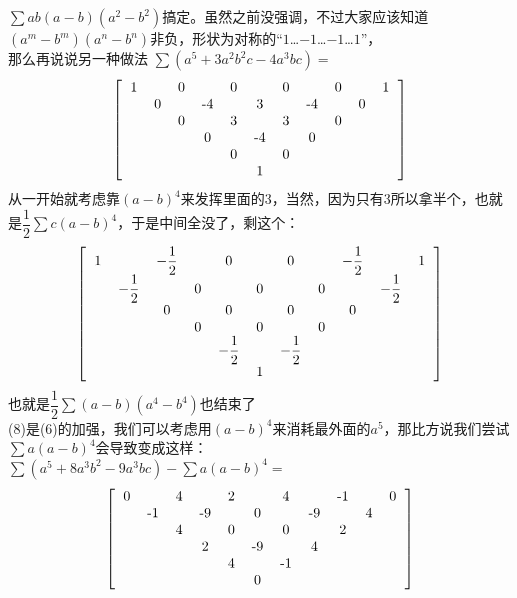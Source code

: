 \documentclass[UTF8]{ctexart}
\begin{document}
$ \displaystyle \sum ab(a-b)(a^{2}-b^{2}) $搞定。虽然之前没强调，不过大家应该知道$ (a^{m}-b^{m})(a^{n}-b^{n}) $非负，形状为对称的“$ 1 $…$ -1 $…$ -1 $…$ 1 $”，\\
那么再说说另一种做法
$ \displaystyle \sum (a^{5}+3a^{2}b^{2}c-4a^{3}bc)= $
  \renewcommand*{\arraystretch}{1.732}\[\left[\begin{matrix}
  	\begin{tabular}{ccccccccccccc}
  		1& &0& &0& &0& &0& &1\\
  		&0& &-4& &3& &-4& &0&\\
  		& &0& &3& &3& &0& &\\
  		& & &0& &-4& &0& & &\\
  		& & & &0& &0& & & &\\
  		& & & & &1& & & & &\\
  	\end{tabular}
  \end{matrix}\right]\]
从一开始就考虑靠$ (a-b)^{4} $来发挥里面的3，当然，因为只有3所以拿半个，也就是$ \dfrac{1}{2} \displaystyle \sum c(a-b)^{4} $，于是中间全没了，剩这个：
 \renewcommand*{\arraystretch}{1.732}\[\left[\begin{matrix}
	\begin{tabular}{ccccccccccccc}
		1& &$ -\dfrac{1}{2} $& &0& &0& &$ -\dfrac{1}{2} $& &1\\
		&$ -\dfrac{1}{2} $& &0& &0& &0& &$ -\dfrac{1}{2} $&\\
		& &0& &0& &0& &0& &\\
		& & &0& &0& &0& & &\\
		& & & &$ -\dfrac{1}{2} $& &$ -\dfrac{1}{2} $& & & &\\
		& & & & &1& & & & &\\
	\end{tabular}
  \end{matrix}\right]\]
也就是$ \displaystyle \dfrac{1}{2} \displaystyle \sum (a-b)(a^4-b^4) $也结束了\\
(8)是(6)的加强，我们可以考虑用$ (a-b)^4 $来消耗最外面的$ a^5 $，那比方说我们尝试$ \displaystyle \sum a(a-b)^4 $会导致变成这样：\\
$  \displaystyle \sum (a^{5}+8 a^{3} b^{2}-9a^{3}bc)-\displaystyle \sum a(a-b)^{4}=$
  \renewcommand*{\arraystretch}{1.732}\[\left[\begin{matrix}
  	\begin{tabular}{ccccccccccccc}
  		0& &4& &2& &4& &-1& &0\\
  		&-1& &-9& &0& &-9& &4&\\
  		& &4& &0& &0& &2& &\\
  		& & &2& &-9& &4& & &\\
  		& & & &4& &-1& & & &\\
  		& & & & &0& & & & &\\
  	\end{tabular}
  \end{matrix}\right]\]
\end{document}
